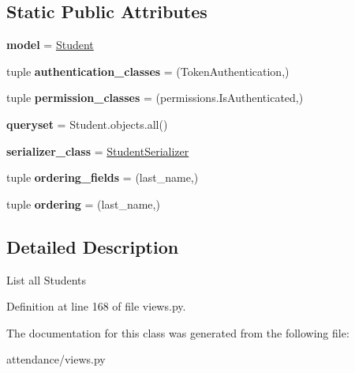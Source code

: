 \subsection*{Static Public Attributes}
\begin{DoxyCompactItemize}
\item 
\hypertarget{classattendance_1_1views_1_1_student_list_a1281cb659407cec208f78bac5256dea8}{}\label{classattendance_1_1views_1_1_student_list_a1281cb659407cec208f78bac5256dea8} 
{\bfseries model} = \hyperlink{classattendance_1_1models_1_1_student}{Student}
\item 
\hypertarget{classattendance_1_1views_1_1_student_list_a47daea8a46fd64f68e918908992a1272}{}\label{classattendance_1_1views_1_1_student_list_a47daea8a46fd64f68e918908992a1272} 
tuple {\bfseries authentication\+\_\+classes} = (Token\+Authentication,)
\item 
\hypertarget{classattendance_1_1views_1_1_student_list_a5c21e968128f0e654516122248f724b9}{}\label{classattendance_1_1views_1_1_student_list_a5c21e968128f0e654516122248f724b9} 
tuple {\bfseries permission\+\_\+classes} = (permissions.\+Is\+Authenticated,)
\item 
\hypertarget{classattendance_1_1views_1_1_student_list_ac17484286456c3ba26bc5359179de4aa}{}\label{classattendance_1_1views_1_1_student_list_ac17484286456c3ba26bc5359179de4aa} 
{\bfseries queryset} = Student.\+objects.\+all()
\item 
\hypertarget{classattendance_1_1views_1_1_student_list_abddb6743e2e7b7eb93cbb3e4eb3701ab}{}\label{classattendance_1_1views_1_1_student_list_abddb6743e2e7b7eb93cbb3e4eb3701ab} 
{\bfseries serializer\+\_\+class} = \hyperlink{classattendance_1_1serializers_1_1_student_serializer}{Student\+Serializer}
\item 
\hypertarget{classattendance_1_1views_1_1_student_list_a649086eaf3451a282cb63acfcb4256fb}{}\label{classattendance_1_1views_1_1_student_list_a649086eaf3451a282cb63acfcb4256fb} 
tuple {\bfseries ordering\+\_\+fields} = (\textquotesingle{}last\+\_\+name\textquotesingle{},)
\item 
\hypertarget{classattendance_1_1views_1_1_student_list_a147a97bdb50a1d7a5a12c2767b1ccc93}{}\label{classattendance_1_1views_1_1_student_list_a147a97bdb50a1d7a5a12c2767b1ccc93} 
tuple {\bfseries ordering} = (\textquotesingle{}last\+\_\+name\textquotesingle{},)
\end{DoxyCompactItemize}


\subsection{Detailed Description}
\begin{DoxyVerb}List all Students
\end{DoxyVerb}
 

Definition at line 168 of file views.\+py.



The documentation for this class was generated from the following file\+:\begin{DoxyCompactItemize}
\item 
attendance/views.\+py\end{DoxyCompactItemize}
